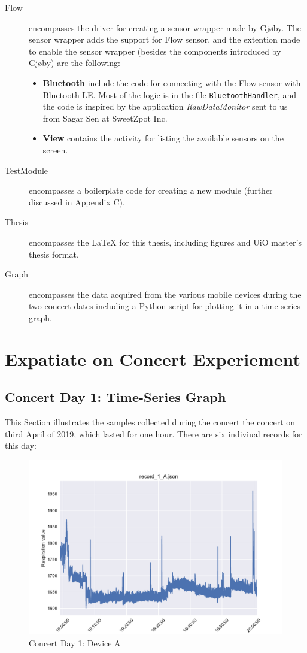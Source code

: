 \begin{description}
    \item[Flow] encompasses the driver for creating a sensor wrapper made by Gjøby. The sensor wrapper adds the support for Flow sensor, and the extention made to enable the sensor wrapper (besides the components introduced by Gjøby) are the following:
    \begin{itemize}
        \item \textbf{Bluetooth} include the code for connecting with the Flow sensor with Bluetooth LE. Most of the logic is in the file \verb|BluetoothHandler|, and the code is inspired by the application \textit{RawDataMonitor} sent to us from Sagar Sen at SweetZpot Inc. 
        \item \textbf{View} contains the activity for listing the available sensors on the screen. 
    \end{itemize}

    \item[TestModule] encompasses a boilerplate code for creating a new module (further discussed in Appendix C).
    \item[Thesis] encompasses the LaTeX for this thesis, including figures and UiO master's thesis format.
    \item[Graph] encompasses the data acquired from the various mobile devices during the two concert dates including a Python script for plotting it in a time-series graph.

\end{description}

\chapter{Expatiate on Concert Experiement}

\section{Concert Day 1: Time-Series Graph}
This Section illustrates the samples collected during the concert the concert on third April of 2019, which lasted 
for one hour. There are six indiviual records for this day: 

\begin{figure}
    \centering
    \includegraphics[scale=0.6]{images/record_1_a.pdf}
    \caption{Concert Day 1: Device A}
    \label{fig:concert_day1_a}
\end{figure}


